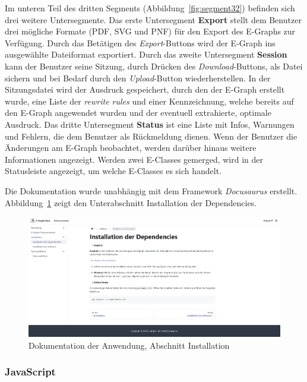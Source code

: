 Im unteren Teil des dritten Segments (Abbildung~\ref{fig:segment32}) befinden sich drei weitere Untersegmente.  
Das erste Untersegment \textbf{Export} stellt dem Benutzer drei mögliche Formate (PDF, SVG und PNF) für den Export des E-Graphs zur Verfügung. Durch das Betätigen des \textit{Export}-Buttons
wird der E-Graph ins ausgewählte Dateiformat exportiert.
Durch das zweite Untersegment \textbf{Session} kann der Benutzer seine Sitzung, durch Drücken des \textit{Download}-Buttons, als Datei sichern und bei Bedarf durch den \textit{Upload}-Button
wiederherstellen. In der Sitzungsdatei wird der Ausdruck gespeichert, durch den der E-Graph erstellt wurde, eine Liste der \textit{rewrite rules} und einer Kennzeichnung, welche 
bereits auf den E-Graph angewendet wurden und der eventuell extrahierte, optimale Ausdruck.
Das dritte Untersegment \textbf{Status} ist eine Liste mit Infos, Warnungen und Fehlern, die dem Benutzer als Rückmeldung dienen. Wenn der Benutzer die Änderungen am E-Graph beobachtet, werden
darüber hinaus weitere Informationen angezeigt. Werden zwei E-Classes gemerged, wird in der Statusleiste angezeigt, um welche E-Classes es sich handelt.  


Die Dokumentation wurde unabhängig mit dem Framework \textit{Docusaurus} erstellt. Abbildung~\ref{fig:docs} zeigt den Unterabschnitt Installation der Dependencies.



\newpage
\begin{figure}[H]
\centering
\includegraphics[scale=0.42, angle=90]{../fig/docs.png}
\caption{Dokumentation der Anwendung, Abschnitt Installation}
\label{fig:docs}
\end{figure}
\newpage

\subsubsection{JavaScript}

